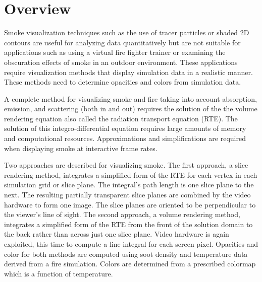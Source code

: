 %
%

\section{Overview}

Smoke visualization techniques such as the use of tracer particles or shaded 2D contours are useful for
analyzing data quantitatively but are not suitable for
applications such as
using a virtual fire fighter trainer
or examining the obscuration effects of smoke in
an outdoor environment.  These applications require visualization methods that display simulation data in a realistic manner.
These methods need to determine opacities and colors from simulation data.

A complete method for visualizing smoke and fire taking into account absorption, emission, and scattering (both in and out)
requires the solution of the the volume rendering equation\cite{} also called the radiation transport equation (RTE)\cite{}.
The solution of this integro-differential equation requires large amounts of memory and computational resources.  Approximations 
and simplifications 
are required when displaying smoke at interactive frame rates.

Two approaches are described for visualizing smoke.  The first approach, a slice rendering method, integrates a simplified form of the RTE 
for each vertex in each simulation grid or slice plane.
The integral's path length is one slice plane to the next.  The resulting partially transparent slice planes are combined by the video hardware to form one image.
The slice planes are oriented to be perpendicular to the
viewer's line of sight. The second approach, a volume rendering method, integrates a simplified form of the RTE 
from the front of the solution domain to the back rather than across just one slice plane.
Video hardware is again exploited, this time to compute a line integral for each screen pixel.  Opacities and color for both methods are
computed using soot density and temperature data derived from a fire simulation.  Colors are determined from a prescribed colormap which
is a function of temperature.





